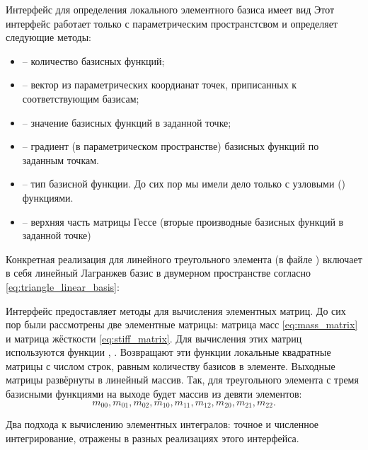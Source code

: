 Интерфейс для определения локального элементного базиса имеет вид
Этот интерфейс работает только с параметрическим пространстсвом
и определяет следующие методы:
\begin{itemize}
\item {} -- количество базисных функций;
\item {} -- вектор из параметрических коордианат
      точек, приписанных к соответствующим базисам;
\item {} -- значение базисных функций в заданной точке;
\item {} -- градиент (в параметрическом пространстве) базисных функций по заданным точкам.
\item {} -- тип базисной функции. До сих пор мы имели дело только с узловыми ()
      функциями.
\item {} -- верхняя часть матрицы Гессе (вторые производные базисных функций в заданной точке)
\end{itemize}

Конкретная реализация для линейного треугольного элемента 
(в файле )
включает в себя линейный Лагранжев базис в двумерном пространстве согласно
\cref{eq:triangle_linear_basis}:


Интерфейс  предоставляет методы
для вычисления элементных матриц.
До сих пор были рассмотрены две элементные матрицы: матрица масс \cref{eq:mass_matrix} и матрица жёсткости \cref{eq:stiff_matrix}.
Для вычисления этих матриц используются функции , .
Возвращают эти функции локальные квадратные матрицы с числом строк,
равным количеству базисов в элементе. 
Выходные матрицы развёрнуты в линейный массив. Так, для треугольного элемента
с тремя базисными функциями на выходе будет массив из девяти элементов:
$$
m_{00}, m_{01}, m_{02}, m_{10}, m_{11}, m_{12}, m_{20}, m_{21}, m_{22}.
$$

Два подхода к вычислению элементных интегралов: точное и численное интегрирование,
отражены в разных реализациях этого интерфейса.

